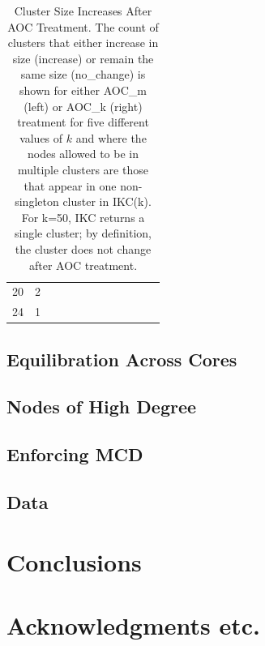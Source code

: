 \documentclass[12pt, oneside]{article}   	%
\begin{document}
\begin{table}
{\begin{tabular}{clllllllllll}
20 &   2 &  &  &  &  &  &  &  &  &  \\ 
24 &   1 &  &  &  &  &  &  &  &  &  \\ 
   \hline
\end{tabular}}
\caption{Cluster Size Increases After AOC Treatment. The count of clusters that either increase in size (increase) or remain the same size (no\_change) is shown
for either AOC\_m (left) or AOC\_k (right) treatment for five different values of $k$ and where the nodes allowed to be in multiple clusters are those that appear in one non-singleton cluster in IKC(k). 
 For k=50, IKC returns a single cluster; by definition, the cluster does not change after AOC treatment.}
\label{tab:tab2}
\end{table}

\clearpage


\subsection{Equilibration Across Cores}

\subsection{Nodes of High Degree}

\subsection{Enforcing MCD}

\subsection{Data}

\section{Conclusions}
\section{Acknowledgments etc.}



\end{document}
